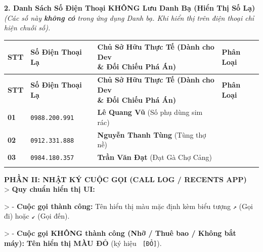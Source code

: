 \documentclass[12pt,a4paper]{article}
\begin{document}
\vspace{0.2cm}



\vspace{0.3cm}\noindent\textbf{\large 2. Danh Sách Số Điện Thoại KHÔNG Lưu Danh Bạ (Hiển Thị Số Lạ)}\\[0.15cm]


\textit{(Các số này \textbf{không có} trong ứng dụng Danh bạ. Khi hiển thị trên điện thoại chỉ hiện chuỗi số).}



\vspace{0.2cm}
\begingroup
\begin{xltabular}{\textwidth}{>{\hsize}X >{\hsize}X >{\hsize}X >{\hsize}X}
\toprule
\textbf{STT} & \textbf{Số Điện Thoại Lạ} & \textbf{Chủ Sở Hữu Thực Tế (Dành cho Dev \newline \& Đối Chiếu Phá Án)} & \textbf{Phân Loại} \\
\midrule
\endfirsthead
\toprule
\textbf{STT} & \textbf{Số Điện Thoại Lạ} & \textbf{Chủ Sở Hữu Thực Tế (Dành cho Dev \newline \& Đối Chiếu Phá Án)} & \textbf{Phân Loại} \\
\midrule
\endhead
\bottomrule
\endfoot
\textbf{01} & \texttt{0988.200.991} & \textbf{Lê Quang Vũ} (Số phụ dùng sim rác) &  \\ \addlinespace[4pt]
\textbf{02} & \texttt{0912.331.888} & \textbf{Nguyễn Thanh Tùng} (Tùng thợ nề) &  \\ \addlinespace[4pt]
\textbf{03} & \texttt{0984.180.357} & \textbf{Trần Văn Đạt} (Đạt Gà Chợ Cảng) &  \\ \addlinespace[4pt]
\end{xltabular}
\endgroup

\vspace{0.2cm}



\vspace{0.35cm}\noindent\textbf{\large  PHẦN II: NHẬT KÝ CUỘC GỌI (CALL LOG / RECENTS APP)}\\[0.15cm]


>  \textbf{Quy chuẩn hiển thị UI:}

> - \textbf{Cuộc gọi thành công:} Tên hiển thị màu mặc định kèm biểu tượng \texttt{↗} (Gọi đi) hoặc \texttt{↙} (Gọi đến).

> - \textbf{Cuộc gọi KHÔNG thành công (Nhỡ / Thuê bao / Không bắt máy):} \textbf{Tên hiển thị MÀU ĐỎ} (ký hiệu \texttt{ [ĐỎ]}).
\end{document}
